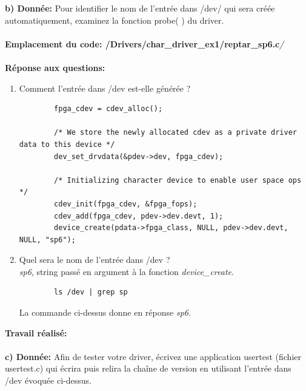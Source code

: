 \textbf{b) Donnée: }Pour identifier le nom de l'entrée dans /dev/ qui sera créée automatiquement, examinez la fonction
probe( ) du driver.\\\\
\textbf{Emplacement du code: /Drivers/char\_driver\_ex1/reptar\_sp6.c}\textit{/}\\\\
\textbf{Réponse aux questions: }
\begin{enumerate}
	\item Comment l'entrée dans /dev est-elle générée ? 
	\begin{lstlisting}
		fpga_cdev = cdev_alloc();
		
		/* We store the newly allocated cdev as a private driver data to this device */
		dev_set_drvdata(&pdev->dev, fpga_cdev);
		
		/* Initializing character device to enable user space ops */
		cdev_init(fpga_cdev, &fpga_fops);
		cdev_add(fpga_cdev, pdev->dev.devt, 1);
		device_create(pdata->fpga_class, NULL, pdev->dev.devt, NULL, "sp6");
	\end{lstlisting}
	\item  Quel sera le nom de l'entrée dans /dev ? \\
	\textit{sp6}, string passé en argument à la fonction \textit{device\_create}.
	\begin{lstlisting}
		ls /dev | grep sp 
	\end{lstlisting}
	La commande ci-dessus donne en réponse \textit{sp6}.
\end{enumerate}
\textbf{Travail réalisé: }\\\\
\textbf{c) Donnée: }Afin de tester votre driver, écrivez une application usertest (fichier usertest.c) qui écrira puis relira
la chaîne de version en utilisant l’entrée dans /dev évoquée ci-dessus.\\

